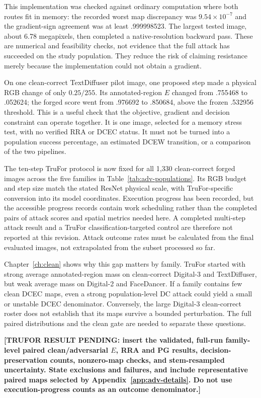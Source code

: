 This implementation was checked against ordinary computation where both routes fit in memory: the recorded worst map discrepancy was $9.54\times10^{-7}$ and the gradient-sign agreement was at least .999998523. The largest tested image, about 6.78 megapixels, then completed a native-resolution backward pass. These are numerical and feasibility checks, not evidence that the full attack has succeeded on the study population. They reduce the risk of claiming resistance merely because the implementation could not obtain a gradient.

On one clean-correct TextDiffuser pilot image, one proposed step made a physical RGB change of only $0.25/255$. Its annotated-region $E$ changed from .755468 to .052624; the forged score went from .976692 to .850684, above the frozen .532956 threshold. This is a useful check that the objective, gradient and decision constraint can operate together. It is one image, selected for a memory stress test, with no verified RRA or DCEC status. It must not be turned into a population success percentage, an estimated DCEW transition, or a comparison of the two pipelines.

The ten-step TruFor protocol is now fixed for all 1,330 clean-correct forged images across the five families in Table~\ref{tab:adv-populations}. Its RGB budget and step size match the stated ResNet physical scale, with TruFor-specific conversion into its model coordinates. Execution progress has been recorded, but the accessible progress records contain work scheduling rather than the completed pairs of attack scores and spatial metrics needed here. A completed multi-step attack result and a TruFor classification-targeted control are therefore not reported at this revision. Attack outcome rates must be calculated from the final evaluated images, not extrapolated from the subset processed so far.

Chapter~\ref{ch:clean} shows why this gap matters by family. TruFor started with strong average annotated-region mass on clean-correct Digital-3 and TextDiffuser, but weak average mass on Digital-2 and FaceDancer. If a family contains few clean DCEC maps, even a strong population-level DC attack could yield a small or unstable DCEC denominator. Conversely, the large Digital-3 clean-correct roster does not establish that its maps survive a bounded perturbation. The full paired distributions and the clean gate are needed to separate these questions.

\par\medskip\noindent\textbf{[TRUFOR RESULT PENDING: insert the validated, full-run family-level paired clean/adversarial $E$, RRA and PG results, decision-preservation counts, nonzero-map checks, and stem-resampled uncertainty. State exclusions and failures, and include representative paired maps selected by Appendix~\ref{app:adv-details}. Do not use execution-progress counts as an outcome denominator.]}\par\medskip

